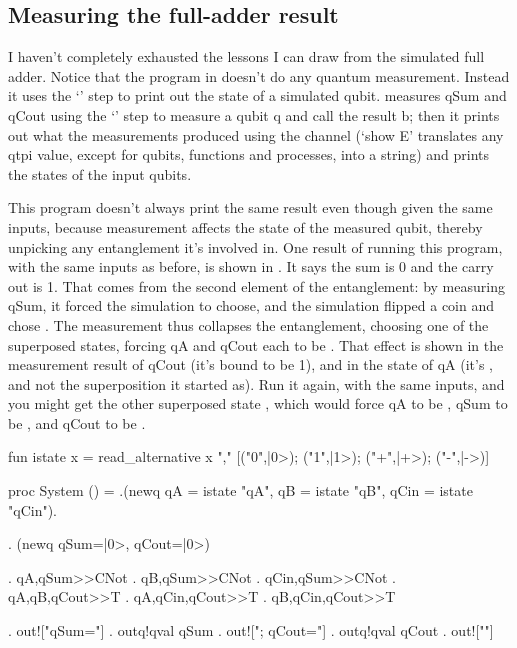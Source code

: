 \subsection{Measuring the full-adder result}

I haven't completely exhausted the lessons I can draw from the simulated full adder. Notice that the program in  doesn't do any quantum measurement. Instead it uses the `' step to print out the state of a simulated qubit.  measures qSum and qCout using the `' step to measure a qubit q and call the result b; then it prints out what the measurements produced using the  channel (`show E' translates any qtpi value, except for qubits, functions and processes, into a string) and prints the states of the input qubits. 

This program doesn't always print the same result even though given the same inputs, because measurement affects the state of the measured qubit, thereby unpicking any entanglement it's involved in. One result of running this program, with the same inputs as before, is shown in . It says the sum is 0 and the carry out is 1. That comes from the second element of the entanglement: by measuring qSum, it forced the simulation to choose, and the simulation flipped a coin and chose \onezeroone{}. The measurement thus collapses the entanglement, choosing one of the superposed states, forcing qA and qCout each to be \one{}. That effect is shown in the measurement result of qCout (it's bound to be 1), and in the state of qA (it's \one{}, and not the superposition it started as). Run it again, with the same inputs, and you might get the other superposed state \zeroonezero{}, which would force qA to be \zero{}, qSum to be \one{}, and qCout to be \zero{}.
 
\mvb{\Cogginswithinputandmeasurement}
fun istate x = 
  read_alternative x "," [("0",|0>); ("1",|1>); ("+",|+>); ("-",|->)]

proc System () =
  .(newq qA   = istate "qA", 
         qB   = istate "qB",
         qCin = istate "qCin").
  
  . (newq qSum=|0>, qCout=|0>) 
  
  . qA,qSum>>CNot  . qB,qSum>>CNot    . qCin,qSum>>CNot 
  . qA,qB,qCout>>T . qA,qCin,qCout>>T . qB,qCin,qCout>>T 
  
  . out!["qSum="] . outq!qval qSum . out!["; qCout="] . outq!qval qCout .  out!["\n"] 
  

